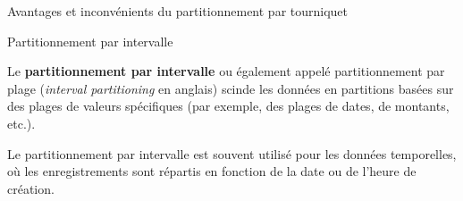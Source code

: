 \begin{frame}{Avantages et inconvénients du partitionnement par tourniquet}


    \pause


\end{frame}


\begin{frame}{Partitionnement par intervalle}

    \begin{definitionbox}
        Le \textbf{partitionnement par intervalle} ou également appelé partitionnement par plage (\textit{interval partitioning} en anglais) scinde les données en partitions basées sur des plages de valeurs spécifiques (par exemple, des plages de dates, de montants, etc.).
    \end{definitionbox}

    \pause

    \begin{noteblock}
        Le partitionnement par intervalle est souvent utilisé pour les données temporelles, où les enregistrements sont répartis en fonction de la date ou de l'heure de création.
    \end{noteblock}
\end{frame}

